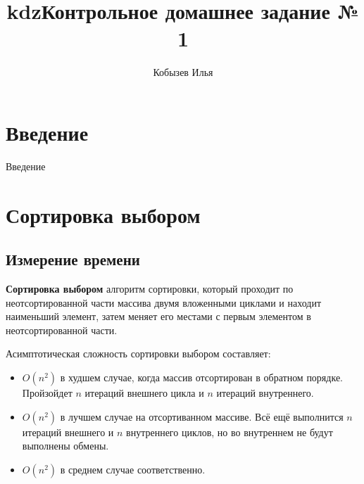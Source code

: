 \documentclass[11pt]{article}
\title{kdz}
\begin{document}
\title{\textbf{Контрольное домашнее задание № 1}}
\author{Кобызев Илья}
\date{}
\maketitle
\newpage

\tableofcontents
\newpage

\section*{Введение}
Введение
\newpage

\setcounter{section}{1}
\section*{\centering Сортировка выбором}

\subsection{Измерение времени}

\begin{center}
\end{center}
{ \hspace*{\fill} }

\begin{center}
\end{center}
{ \hspace*{\fill} }

\textbf{Сортировка выбором} алгоритм сортировки,
который проходит по неотсортированной части массива двумя вложенными циклами и находит 
наименьший элемент, затем меняет его местами с первым элементом в неотсортированной части.

Асимптотическая сложность сортировки выбором составляет:
\begin{itemize}
    \item $O(n^2)$ в худшем случае, когда массив отсортирован в обратном порядке. Пройзойдет $n$
    итераций внешнего цикла и $n$ итераций внутреннего.
    \item $O(n^2)$ в лучшем случае на отсортиванном массиве. Всё ещё выполнится $n$ итераций
    внешнего и $n$ внутреннего циклов, но во внутреннем не будут выполнены обмены.
    \item $O(n^2)$ в среднем случае соответственно.
\end{itemize}
\end{document}
